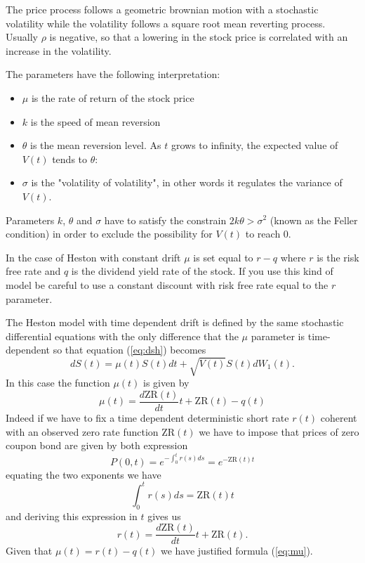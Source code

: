 The price process follows a geometric brownian motion with a stochastic volatility while the volatility follows a square root mean reverting process. Usually $\rho$ is negative, so that a lowering in the stock price is correlated with an increase in the volatility.

The parameters have the following interpretation:
\begin{itemize}
\item $\mu$ is the rate of return of the stock price
\item $k$ is the speed of mean reversion
\item $\theta$ is the mean reversion level. As $t$ grows to infinity, the expected value of $V(t)$ tends to $\theta$:
\item $\sigma$ is the "volatility of volatility", in other words it regulates the variance of $V(t)$.
\end{itemize}

Parameters $k$, $\theta$ and $\sigma$ have to satisfy the constrain $2k\theta>\sigma^2$ (known as the Feller condition) in order to exclude the possibility for $V(t)$ to reach 0.

In the case of Heston with constant drift $\mu$ is set equal to $r-q$ where $r$ is the risk free rate and $q$ is the dividend yield rate of the stock. If you use this kind of model be careful to use a constant discount with risk free rate equal to the $r$ parameter.

The Heston model with time dependent drift is defined by the same stochastic differential equations with the only difference that the $\mu$ parameter is time-dependent so that equation (\ref{eq:dsh}) becomes
\begin{equation}
dS(t) = \mu(t) S(t)dt + \sqrt{V(t)}S(t)dW_1(t).
\end{equation}
In this case the function $\mu(t)$ is given by
\begin{equation}\label{eq:mu}
\mu(t) = \frac{d\mathrm{ZR}(t)}{dt}t + \mathrm{ZR}(t) - q(t)
\end{equation}
Indeed if we have to fix a time dependent deterministic short rate $r(t)$ coherent with an observed zero rate function $\mathrm{ZR}(t)$ we have to impose that prices of zero coupon bond are given by both expression
\begin{equation}
P(0,t) = e^{-\int_0^t r(s)ds} = e^{-\mathrm{ZR}(t)t}
\end{equation}
equating the two exponents we have
\begin{equation}
\int_0^t r(s)ds = \mathrm{ZR}(t)t
\end{equation}
and deriving this expression in $t$ gives us
\begin{equation}
r(t) = \frac{d\mathrm{ZR}(t)}{dt}t + \mathrm{ZR}(t).
\end{equation}
Given that $\mu(t) = r(t) - q(t)$ we have justified formula (\ref{eq:mu}).


